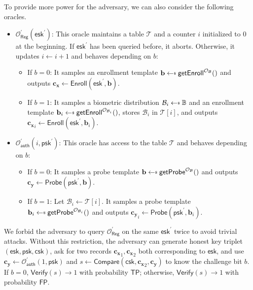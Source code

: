 To provide more power for the adversary, we can also consider the following oracles.

\begin{itemize}
	\item $\mathcal{O}_{\textsf{Reg}}^\prime(\textsf{esk}^\prime)$: This oracle maintains a table $\mathcal{T}$ and a counter $i$ initialized to $0$ at the beginning. If $\textsf{esk}^\prime$ has been queried before, it aborts. Otherwise, it updates $i \gets i+1$ and behaves depending on $b$:
	\begin{itemize}
		\item If $b = 0$: It samples an enrollment template $\mathbf{b} \getsdollar \textsf{getEnroll}^{\mathcal{O}_{\mathcal{B}}}()$ and outputs $\mathbf{c_x} \gets \textsf{Enroll}(\textsf{esk}^\prime, \mathbf{b})$.

		\item If $b = 1$: It samples a biometric distribution $\mathcal{B}_i \getsdollar \mathbb{B}$ and an enrollment template $\mathbf{b}_i \getsdollar \textsf{getEnroll}^{\mathcal{O}_{\mathcal{B}_i}}()$, stores $\mathcal{B}_i$ in $\mathcal{T}[i]$, and outputs $\mathbf{c_x}_i \gets \textsf{Enroll}(\textsf{esk}^\prime, \mathbf{b}_i)$.
	\end{itemize}

	\item $\mathcal{O}_{\textsf{auth}}^\prime(i, \textsf{psk}^\prime)$: This oracle has access to the table $\mathcal{T}$ and behaves depending on $b$:
	\begin{itemize}
		\item If $b = 0$: It samples a probe template $\mathbf{b} \getsdollar \textsf{getProbe}^{\mathcal{O}_{\mathcal{B}}}()$ and outputs $\mathbf{c_y} \gets \textsf{Probe}(\textsf{psk}^\prime, \mathbf{b})$.

		\item If $b = 1$: Let $\mathcal{B}_i \gets \mathcal{T}[i]$. It samples a probe template $\mathbf{b}_i \getsdollar \textsf{getProbe}^{\mathcal{O}_{\mathcal{B}_i}} ()$ and outputs $\mathbf{c_y}_i \gets \textsf{Probe}(\textsf{psk}^\prime, \mathbf{b}_i)$.
	\end{itemize}
	
\end{itemize}

We forbid the adversary to query $\mathcal{O}_{\textsf{Reg}}^\prime$ on the same $\textsf{esk}^\prime$ twice to avoid trivial attacks. Without this restriction, the adversary can generate honest key triplet $(\textsf{esk}, \textsf{psk}, \textsf{csk})$, ask for two records $\mathbf{c_x}_1, \mathbf{c_x}_2$ both corresponding to $\textsf{esk}$, and use $\mathbf{c_y} \gets \mathcal{O}_{\textsf{auth}}^\prime(1, \textsf{psk})$ and $s \gets \textsf{Compare}(\textsf{csk}, \mathbf{c_x}_2, \mathbf{c_y})$ to know the challenge bit $b$. If $b = 0$, $\textsf{Verify}(s) \to 1$ with probability $\textsf{TP}$; otherwise, $\textsf{Verify}(s) \to 1$ with probability $\textsf{FP}$.

